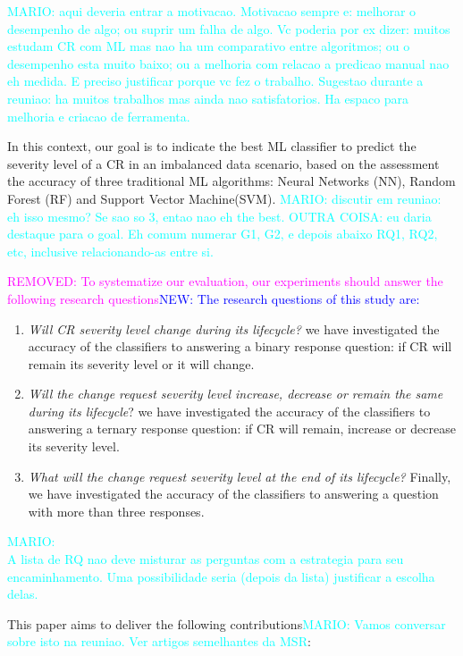 \documentclass[10pt, conference]{IEEEtran}
\newcommand{\mario}[1]{\noindent\textcolor{cyan}{MARIO: {#1}}}
\newcommand{\rem}[1]{\noindent\textcolor{magenta}{REMOVED: {#1}}}
\newcommand{\new}[1]{\noindent\textcolor{blue}{NEW: {#1}}}
\newcommand{\mario}[1]{}
\newcommand{\rem}[1]{}
\newcommand{\new}[1]{#1}
\begin{document}
\mario{aqui deveria entrar a motivacao. Motivacao sempre e: melhorar o desempenho de algo; ou suprir um falha de algo. Vc poderia por ex dizer: muitos estudam CR com ML mas nao ha um comparativo entre algoritmos; ou o desempenho esta muito baixo; ou a melhoria com relacao a predicao manual nao eh medida. E preciso justificar porque vc fez o trabalho. Sugestao durante a reuniao: ha muitos trabalhos mas ainda nao satisfatorios. Ha espaco para melhoria e criacao de ferramenta.}

In this context, our goal is to indicate the best ML classifier to predict the severity level of a CR in an imbalanced data scenario, based on the assessment the accuracy of three traditional ML algorithms: Neural Networks (NN), Random Forest (RF) and Support Vector Machine(SVM). \mario{discutir em reuniao: eh isso mesmo? Se sao so 3, entao nao eh the best. OUTRA COISA: eu daria destaque para o goal. Eh comum numerar G1, G2, e depois abaixo RQ1, RQ2, etc, inclusive relacionando-as entre si.}

\rem{To systematize our evaluation, our experiments should answer the following research questions}\new{The research questions of this study are:}

\begin{enumerate}[RQ 1:]
  \item \textit{Will CR severity level change during its lifecycle?} we have investigated the accuracy of the classifiers to answering a binary response question: if CR will remain its severity level or it will change.
  \item \textit{Will the change request severity level increase, decrease or remain the same during its lifecycle}? we have investigated the accuracy of the classifiers to answering a ternary response question: if CR will remain, increase or decrease its severity level.
  \item \textit{What will the change request severity level at the end of its lifecycle?} Finally, we have investigated the accuracy of the classifiers to answering a question with more than three responses.
\end{enumerate}

\mario{\\ A lista de RQ nao deve misturar as perguntas com a estrategia para seu encaminhamento. Uma possibilidade seria (depois da lista) justificar a escolha delas.}

This paper aims to deliver the following contributions\mario{Vamos conversar sobre isto na reuniao. Ver artigos semelhantes da MSR}: 
\end{document}
